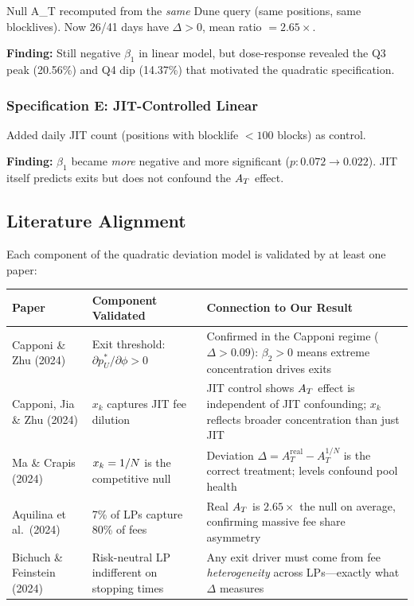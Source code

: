 Null A\_T recomputed from the \emph{same} Dune query (same positions, same
blocklives). Now 26/41 days have $\Delta > 0$, mean ratio $= 2.65\times$.

\textbf{Finding:} Still negative $\beta_1$ in linear model, but dose-response
revealed the Q3 peak (20.56\%) and Q4 dip (14.37\%) that motivated the
quadratic specification.

\subsubsection{Specification E: JIT-Controlled Linear}

Added daily JIT count (positions with blocklife $< 100$ blocks) as control.

\textbf{Finding:} $\beta_1$ became \emph{more} negative and more significant
($p: 0.072 \to 0.022$). JIT itself predicts exits but does not confound the
$A_T$ effect.


\subsection{Literature Alignment}\label{subsec:econ-literature}

Each component of the quadratic deviation model is validated by at least one
paper:

\begin{center}
\begin{tabular}{@{}p{3.5cm}p{4cm}p{5.5cm}@{}}
\toprule
Paper & Component Validated & Connection to Our Result \\
\midrule
Capponi \& Zhu (2024) &
  Exit threshold: $\partial p_U^*/\partial\phi > 0$ &
  Confirmed in the Capponi regime ($\Delta > 0.09$):
  $\beta_2 > 0$ means extreme concentration drives exits \\[6pt]
Capponi, Jia \& Zhu (2024) &
  $x_k$ captures JIT fee dilution &
  JIT control shows $A_T$ effect is independent of JIT confounding;
  $x_k$ reflects broader concentration than just JIT \\[6pt]
Ma \& Crapis (2024) &
  $x_k = 1/N$ is the competitive null &
  Deviation $\Delta = A_T^{\text{real}} - A_T^{1/N}$ is the correct treatment;
  levels confound pool health \\[6pt]
Aquilina et al.\ (2024) &
  7\% of LPs capture 80\% of fees &
  Real $A_T$ is $2.65\times$ the null on average, confirming massive fee share
  asymmetry \\[6pt]
Bichuch \& Feinstein (2024) &
  Risk-neutral LP indifferent on stopping times &
  Any exit driver must come from fee \emph{heterogeneity} across LPs---exactly
  what $\Delta$ measures \\
\bottomrule
\end{tabular}
\end{center}

